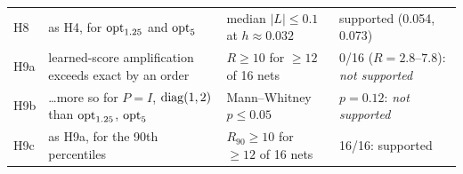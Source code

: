 \begin{table}[t]
\begin{ruledtabular}
\begin{tabular}{p{}p{}p{}p{}}
H8 & as H4, for $\mathrm{opt}_{1.25}$ and $\mathrm{opt}_{5}$ & median $|L|\leq0.1$ at $h\approx0.032$ & supported (0.054, 0.073) \\
H9a & learned-score amplification exceeds exact by an order & $R\geq10$ for $\geq12$ of 16 nets & 0/16 ($R=2.8$--$7.8$): \emph{not supported} \\
H9b & \ldots more so for $P=I$, $\mathrm{diag}(1,2)$ than $\mathrm{opt}_{1.25}$, $\mathrm{opt}_{5}$ & Mann--Whitney $p\leq0.05$ & $p=0.12$: \emph{not supported} \\
H9c & as H9a, for the 90th percentiles & $R_{90}\geq10$ for $\geq12$ of 16 nets & 16/16: supported \\
\end{tabular}
\end{ruledtabular}
\end{table}
